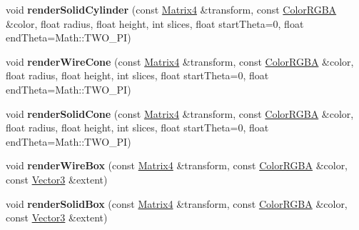 \begin{DoxyCompactItemize}
\item 
void {\bfseries render\+Solid\+Cylinder} (const \hyperlink{class_i_dream_sky_1_1_matrix4}{Matrix4} \&transform, const \hyperlink{class_i_dream_sky_1_1_color_r_g_b_a}{Color\+R\+G\+BA} \&color, float radius, float height, int slices, float start\+Theta=0, float end\+Theta=Math\+::\+T\+W\+O\+\_\+\+PI)\hypertarget{class_i_dream_sky_1_1_i_component_debug_renderer_a87a6e169172662ab69b00679228ae6df}{}\label{class_i_dream_sky_1_1_i_component_debug_renderer_a87a6e169172662ab69b00679228ae6df}

\item 
void {\bfseries render\+Wire\+Cone} (const \hyperlink{class_i_dream_sky_1_1_matrix4}{Matrix4} \&transform, const \hyperlink{class_i_dream_sky_1_1_color_r_g_b_a}{Color\+R\+G\+BA} \&color, float radius, float height, int slices, float start\+Theta=0, float end\+Theta=Math\+::\+T\+W\+O\+\_\+\+PI)\hypertarget{class_i_dream_sky_1_1_i_component_debug_renderer_aabe06931f3b3d1b1bf1d0e996ab6fb4d}{}\label{class_i_dream_sky_1_1_i_component_debug_renderer_aabe06931f3b3d1b1bf1d0e996ab6fb4d}

\item 
void {\bfseries render\+Solid\+Cone} (const \hyperlink{class_i_dream_sky_1_1_matrix4}{Matrix4} \&transform, const \hyperlink{class_i_dream_sky_1_1_color_r_g_b_a}{Color\+R\+G\+BA} \&color, float radius, float height, int slices, float start\+Theta=0, float end\+Theta=Math\+::\+T\+W\+O\+\_\+\+PI)\hypertarget{class_i_dream_sky_1_1_i_component_debug_renderer_abeda76c526fa336f290520d318a0eb31}{}\label{class_i_dream_sky_1_1_i_component_debug_renderer_abeda76c526fa336f290520d318a0eb31}

\item 
void {\bfseries render\+Wire\+Box} (const \hyperlink{class_i_dream_sky_1_1_matrix4}{Matrix4} \&transform, const \hyperlink{class_i_dream_sky_1_1_color_r_g_b_a}{Color\+R\+G\+BA} \&color, const \hyperlink{class_i_dream_sky_1_1_vector3}{Vector3} \&extent)\hypertarget{class_i_dream_sky_1_1_i_component_debug_renderer_abaf3f7219bd34c0f075c509a71143f40}{}\label{class_i_dream_sky_1_1_i_component_debug_renderer_abaf3f7219bd34c0f075c509a71143f40}

\item 
void {\bfseries render\+Solid\+Box} (const \hyperlink{class_i_dream_sky_1_1_matrix4}{Matrix4} \&transform, const \hyperlink{class_i_dream_sky_1_1_color_r_g_b_a}{Color\+R\+G\+BA} \&color, const \hyperlink{class_i_dream_sky_1_1_vector3}{Vector3} \&extent)\hypertarget{class_i_dream_sky_1_1_i_component_debug_renderer_a435d94b22bc31890a9c88a8efabee245}{}\label{class_i_dream_sky_1_1_i_component_debug_renderer_a435d94b22bc31890a9c88a8efabee245}


\end{DoxyCompactItemize}

